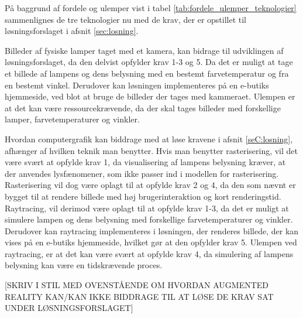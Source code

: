 På baggrund af fordele og ulemper vist i tabel \ref{tab:fordele_ulemper_teknologier} sammenlignes de tre teknologier nu med de krav, der er opstillet til løsningsforslaget i afsnit \ref{sec:losning}. 

Billeder af fysiske lamper taget med et kamera, kan bidrage til udviklingen af løsningsforslaget, da den delvist opfylder krav 1-3 og 5. Da det er muligt at tage et billede af lampens og dens belysning med en bestemt farvetemperatur og fra en bestemt vinkel. Derudover kan løsningen implementeres på en e-butiks hjemmeside, ved blot at bruge de billeder der tages med kammeraet. Ulempen er at det kan være ressourcekrævende, da der skal tages billeder med forskellige lamper, farvetemperaturer og vinkler.

Hvordan computergrafik kan biddrage med at løse kravene i afsnit \ref{seC:losning}, afhænger af hvilken teknik man benytter. Hvis man benytter rasterisering, vil det være svært at opfylde krav 1, da visualisering af lampens belysning kræver, at der anvendes lysfænomener, som ikke passer ind i modellen for rasterisering. Rasterisering vil dog være oplagt til at opfylde krav 2 og 4, da den som nævnt er bygget til at rendere billede med høj brugerinteraktion og kort renderingstid.
Raytracing, vil derimod være oplagt til at opfylde krav 1-3, da det er muligt at simulere lampen og dens belysning med forskellige farvetemperaturer og vinkler. Derudover kan raytracing implementeres i løsningen, der renderes billede, der kan vises på en e-butiks hjemmeside, hvilket gør at den opfylder krav 5. Ulempen ved raytracing, er at det kan være svært at opfylde krav 4, da simulering af lampens belysning kan være en tidskrævende proces.

[SKRIV I STIL MED OVENSTÅENDE OM HVORDAN AUGMENTED REALITY KAN/KAN IKKE BIDDRAGE TIL AT LØSE DE KRAV SAT UNDER LØSNINGSFORSLAGET]



\clearpage

